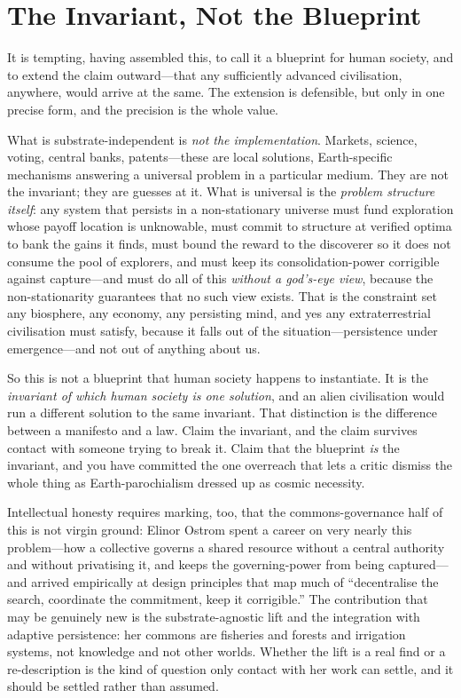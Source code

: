 \documentclass{article}
\begin{document}
\section*{The Invariant, Not the Blueprint}

It is tempting, having assembled this, to call it a blueprint for human society, and to extend the claim outward---that any sufficiently advanced civilisation, anywhere, would arrive at the same. The extension is defensible, but only in one precise form, and the precision is the whole value.

What is substrate-independent is \textit{not the implementation}. Markets, science, voting, central banks, patents---these are local solutions, Earth-specific mechanisms answering a universal problem in a particular medium. They are not the invariant; they are guesses at it. What is universal is the \textit{problem structure itself}: any system that persists in a non-stationary universe must fund exploration whose payoff location is unknowable, must commit to structure at verified optima to bank the gains it finds, must bound the reward to the discoverer so it does not consume the pool of explorers, and must keep its consolidation-power corrigible against capture---and must do all of this \textit{without a god's-eye view}, because the non-stationarity guarantees that no such view exists. That is the constraint set any biosphere, any economy, any persisting mind, and yes any extraterrestrial civilisation must satisfy, because it falls out of the situation---persistence under emergence---and not out of anything about us.

So this is not a blueprint that human society happens to instantiate. It is the \textit{invariant of which human society is one solution}, and an alien civilisation would run a different solution to the same invariant. That distinction is the difference between a manifesto and a law. Claim the invariant, and the claim survives contact with someone trying to break it. Claim that the blueprint \textit{is} the invariant, and you have committed the one overreach that lets a critic dismiss the whole thing as Earth-parochialism dressed up as cosmic necessity.

Intellectual honesty requires marking, too, that the commons-governance half of this is not virgin ground: Elinor Ostrom spent a career on very nearly this problem---how a collective governs a shared resource without a central authority and without privatising it, and keeps the governing-power from being captured---and arrived empirically at design principles that map much of ``decentralise the search, coordinate the commitment, keep it corrigible.'' The contribution that may be genuinely new is the substrate-agnostic lift and the integration with adaptive persistence: her commons are fisheries and forests and irrigation systems, not knowledge and not other worlds. Whether the lift is a real find or a re-description is the kind of question only contact with her work can settle, and it should be settled rather than assumed.
\end{document}
